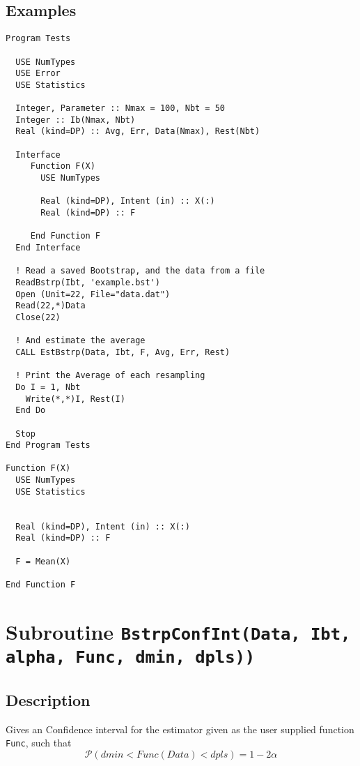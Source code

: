 \subsection{Examples}

\begin{lstlisting}[emph=EstBstrp,
                   emphstyle=\color{blue},
                   frame=trBL,
                   caption=Estimating the average.,
                   label=EstBstrp]
Program Tests

  USE NumTypes
  USE Error
  USE Statistics

  Integer, Parameter :: Nmax = 100, Nbt = 50
  Integer :: Ib(Nmax, Nbt)
  Real (kind=DP) :: Avg, Err, Data(Nmax), Rest(Nbt)

  Interface 
     Function F(X)
       USE NumTypes
         
       Real (kind=DP), Intent (in) :: X(:)
       Real (kind=DP) :: F

     End Function F
  End Interface

  ! Read a saved Bootstrap, and the data from a file
  ReadBstrp(Ibt, 'example.bst')
  Open (Unit=22, File="data.dat")
  Read(22,*)Data
  Close(22)

  ! And estimate the average
  CALL EstBstrp(Data, Ibt, F, Avg, Err, Rest)

  ! Print the Average of each resampling
  Do I = 1, Nbt
    Write(*,*)I, Rest(I)
  End Do

  Stop
End Program Tests

Function F(X)
  USE NumTypes
  USE Statistics
         

  Real (kind=DP), Intent (in) :: X(:)
  Real (kind=DP) :: F

  F = Mean(X)

End Function F

\end{lstlisting}


\section{Subroutine \texttt{BstrpConfInt(Data, Ibt, alpha, Func, dmin, dpls))}}

\subsection{Description}

Gives an Confidence interval for the estimator given as the user
supplied function \texttt{Func}, such that
\begin{displaymath}
  \mathcal P(dmin<Func(Data)<dpls) = 1-2\alpha
\end{displaymath}

